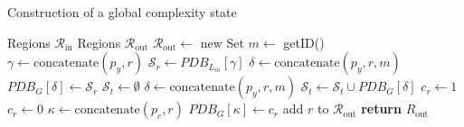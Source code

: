 \documentclass[../../main.tex]{subfiles}
\begin{document}
\begin{algorithm}
   \caption{Construction of a global complexity state}
   \label{alg:complexity_estimation}

   \begin{algorithmic}[1]
         \REQUIRE Regions $\mathcal{R}_{\text{in}}$
         \ENSURE Regions $\mathcal{R}_{\text{out}}$
         \STATE $\mathcal{R}_{\text{out}} \leftarrow $ new Set
         \STATE $m \leftarrow$ getID() 
            \STATE $\gamma \leftarrow \text{concatenate}(p_y, r)$
            \STATE $\mathcal{S}_r \leftarrow PDB_{L_m}[\gamma]$
            \STATE $\delta \leftarrow \text{concatenate}(p_y, r, m)$
            \STATE $PDB_G[\delta] \leftarrow \mathcal{S}_r$
            \STATE $\mathcal{S}_t \leftarrow \emptyset$
               \STATE $\delta \leftarrow \text{concatenate}(p_y, r, m)$
               \STATE $\mathcal{S}_t \leftarrow \mathcal{S}_t \cup PDB_G[\delta]$
            \ENDFOR
               \STATE $c_r \leftarrow 1$ 
            \ELSE 
               \STATE $c_r \leftarrow 0$ 
            \ENDIF
            \STATE $\kappa \leftarrow \text{concatenate}(p_c, r)$
               \STATE $PDB_G[\kappa] \leftarrow c_r$
               \STATE add $r$ to $\mathcal{R}_{\text{out}}$
            \ENDIF
         \ENDFOR
         \STATE \textbf{return} $R_{\text{out}}$
   \end{algorithmic}
\end{algorithm}
\end{document}
